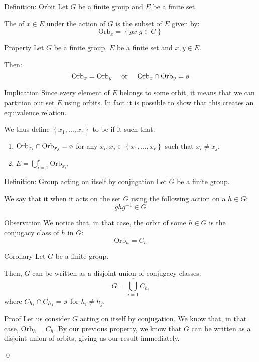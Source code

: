 \documentclass[a4paper]{article}
\begin{document}
\begin{parag}{Definition: Orbit}
    Let $G$ be a finite group and $E$ be a finite set.

    The  of $x \in E$ under the action of $G$ is the subset of $E$ given by: 
    \[\text{Orb}_x = \left\{gx | g \in G\right\} \]
\end{parag}

\begin{parag}{Property}
    Let $G$ be a finite group, $E$ be a finite set and $x,y \in E$.

    Then: 
    \[\text{Orb}_x = \text{Orb}_y \mathspace \text{ or } \mathspace \text{Orb}_x \cap \text{Orb}_y = \o\]
    
    \begin{subparag}{Implication}
        Since every element of $E$ belongs to some orbit, it means that we can partition our set $E$ using orbits. In fact it is possible to show that this creates an equivalence relation.

        We thus define $\left\{x_1, \ldots, x_r\right\}$ to be  if it such that: 
        \begin{enumerate}[left=0pt]
            \item $\displaystyle \text{Orb}_{x_i} \cap \text{Orb}_{x_j} = \o$ for any $x_i, x_j \in \left\{x_1, \ldots, x_r\right\}$ such that $x_i \neq x_j$.
            \item $\displaystyle E = \bigcup_{i=1}^{r} \text{Orb}_{x_i}$.
        \end{enumerate}
    \end{subparag}
\end{parag}

\begin{parag}{Definition: Group acting on itself by conjugation}
    Let $G$ be a finite group.

    We say that it  when it acts on the set $G$ using the following action on a $h \in G$:     
    \[g h g^{-1} \in G\]
    
    \begin{subparag}{Observation}
        We notice that, in that case, the orbit of some $h \in G$ is the conjugacy class of $h$ in $G$:
        \[\text{Orb}_h = C_h\]
    \end{subparag}
\end{parag}

\begin{parag}{Corollary}
    Let $G$ be a finite group.

    Then, $G$ can be written as a disjoint union of conjugacy classes:
    \[G = \bigcup_{i=1}^{r} C_{h_i}\]
    where $C_{h_i} \cap C_{h_j} = \o$ for $h_i \neq h_j$.

    \begin{subparag}{Proof}
        Let us consider $G$ acting on itself by conjugation. We know that, in that case, $\text{Orb}_h = C_h$. By our previous property, we know that $G$ can be written as a disjoint union of orbits, giving us our result immediately.

        \qed
    \end{subparag}
\end{parag}
\end{document}
